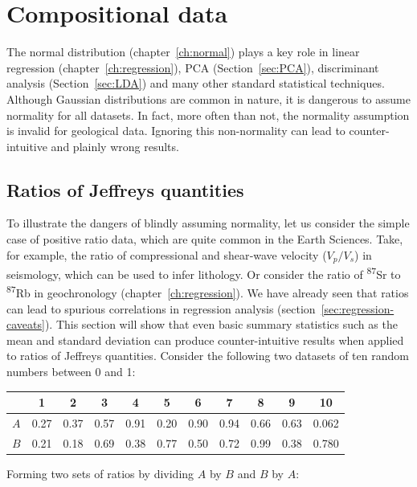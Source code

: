 \chapter{Compositional data}
\label{ch:compositional}

The normal distribution (chapter~\ref{ch:normal}) plays a key role in
linear regression (chapter~\ref{ch:regression}), PCA
(Section~\ref{sec:PCA}), discriminant analysis (Section~\ref{sec:LDA})
and many other standard statistical techniques. Although Gaussian
distributions are common in nature, it is dangerous to assume
normality for all datasets. In fact, more often than not, the
normality assumption is invalid for geological data. Ignoring this
non-normality can lead to counter-intuitive and plainly wrong results.

\section{Ratios of Jeffreys quantities}
\label{sec:ratios}

To illustrate the dangers of blindly assuming normality, let us
consider the simple case of positive ratio data, which are quite
common in the Earth Sciences.  Take, for example, the ratio of
compressional and shear‐wave velocity ($V_p/V_s$) in seismology, which
can be used to infer lithology. Or consider the ratio of
\textsuperscript{87}Sr to \textsuperscript{87}Rb in geochronology
(chapter~\ref{ch:regression}).  We have already seen that ratios can
lead to spurious correlations in regression analysis
(section~\ref{sec:regression-caveats}).  This section will show that
even basic summary statistics such as the mean and standard deviation
can produce counter-intuitive results when applied to ratios of
Jeffreys quantities. Consider the following two datasets of ten random
numbers between 0 and 1:

\begin{center}
  \begin{tabular}{c|cccccccccc}
    & 1 & 2 & 3 & 4 & 5 & 6 & 7 & 8 & 9 & 10 \\ \hline
    $A$ & 0.27 & 0.37 & 0.57 & 0.91 & 0.20 & 0.90 & 0.94 & 0.66 & 0.63 & 0.062 \\
    $B$ & 0.21 & 0.18 & 0.69 & 0.38 & 0.77 & 0.50 & 0.72 & 0.99 & 0.38 & 0.780 
  \end{tabular}
\end{center}

Forming two sets of ratios by dividing $A$ by $B$ and $B$ by $A$:

